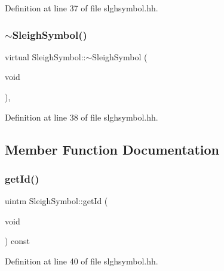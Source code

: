 Definition at line 37 of file slghsymbol.\+hh.

\mbox{\label{class_sleigh_symbol_a68ec4af12e1374776ca3d6552e5e5680}} 
\subsubsection{\texorpdfstring{$\sim$SleighSymbol()}{~SleighSymbol()}}
{\footnotesize\ttfamily virtual Sleigh\+Symbol\+::$\sim$\+Sleigh\+Symbol (\begin{DoxyParamCaption}\item[{void}]{ }\end{DoxyParamCaption})\hspace{0.3cm}{\ttfamily [inline]}, {\ttfamily [virtual]}}



Definition at line 38 of file slghsymbol.\+hh.



\subsection{Member Function Documentation}
\mbox{\label{class_sleigh_symbol_a48557f9371e94c4940c682720e9c81c1}} 
\subsubsection{\texorpdfstring{getId()}{getId()}}
{\footnotesize\ttfamily uintm Sleigh\+Symbol\+::get\+Id (\begin{DoxyParamCaption}\item[{void}]{ }\end{DoxyParamCaption}) const\hspace{0.3cm}{\ttfamily [inline]}}



Definition at line 40 of file slghsymbol.\+hh.

